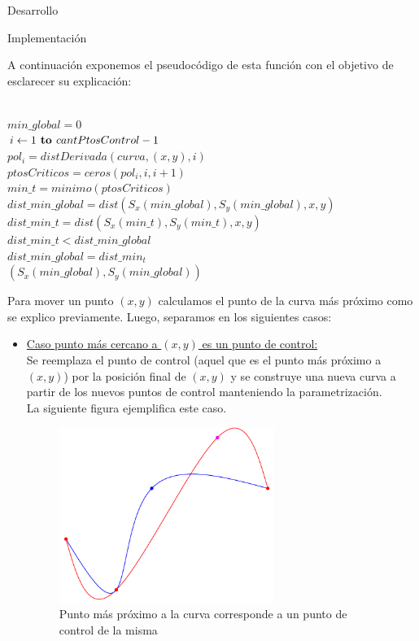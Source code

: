 \begin{section}{Desarrollo}
\begin{subsection}{Implementación}
\begin{itemize}
				A continuación exponemos el pseudocódigo de esta función con el objetivo de esclarecer su explicación:\\
				
				\begin{pseudo}
					\\
					\tab $min\_global = 0$\\
					\tab \FOR $i\gets 1 \textbf{ to } cantPtosControl-1$\\
					\tab\tab $pol_i = distDerivada(curva,(x,y),i)$\\
					\tab\tab $ptosCriticos = ceros(pol_i,i,i+1)$\\
					\tab\tab $min\_t = minimo(ptosCriticos)$\\
					\tab\tab $dist\_min\_global = dist(S_x(min\_global),S_y(min\_global),x,y)$\\
					\tab\tab $dist\_min\_t = dist(S_x(min\_t),S_y(min\_t),x,y)$\\
					\tab\tab \IF $dist\_min\_t < dist\_min\_global$ \THEN\\
					\tab\tab\tab $dist\_min\_global = dist\_min_t$\\
					\tab \RET $(S_x(min\_global),S_y(min\_global))$\\
				\end{pseudo}
				
				Para mover un punto $(x,y)$	calculamos el punto de la curva más próximo como se explico previamente. Luego, separamos en los siguientes casos:
				
				\begin{itemize}
					\item \underline{Caso punto más cercano a $(x,y)$ es un punto de control:}\\
					
						Se reemplaza el punto de control (aquel que es el punto más próximo a $(x,y)$) por la posición final de $(x,y)$ y se construye una nueva curva a partir de los nuevos puntos de control manteniendo la parametrización.\\
						
						La siguiente figura ejemplifica este caso.\\
						
						\begin{figure}[H]
							\centering
							\includegraphics[width=7cm]{graficos/ptoCtrl.pdf}
							\caption{Punto más próximo a la curva corresponde a un punto de control de la misma}
							\label{fig:ptoCtrl}
						\end{figure}
						

\end{itemize}
\end{itemize}
\end{subsection}
\end{section}
